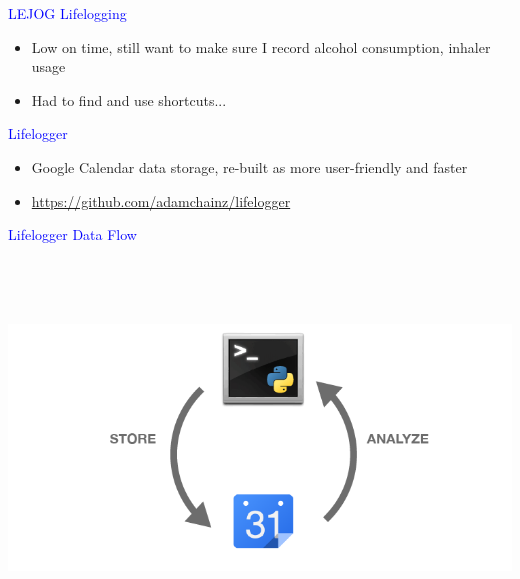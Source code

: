 \documentclass[landscape]{slides}
\begin{document}
\begin{slide}

    \textcolor{blue}{\Large{LEJOG Lifelogging}}

    \begin{itemize}
        \item Low on time, still want to make sure I record alcohol consumption, inhaler usage
        \item Had to find and use shortcuts...
    \end{itemize}

\end{slide}




\begin{slide}

    \textcolor{blue}{\Large{Lifelogger}}

    \begin{itemize}
        \item Google Calendar data storage, re-built as more user-friendly and faster
        \item \url{https://github.com/adamchainz/lifelogger}
    \end{itemize}

\end{slide}


\begin{slide}

    \textcolor{blue}{\Large{Lifelogger Data Flow}}

    \begin{center}
        \includegraphics[height=10cm]{lifelog-input-basic}
    \end{center}

\end{slide}
\end{document}
